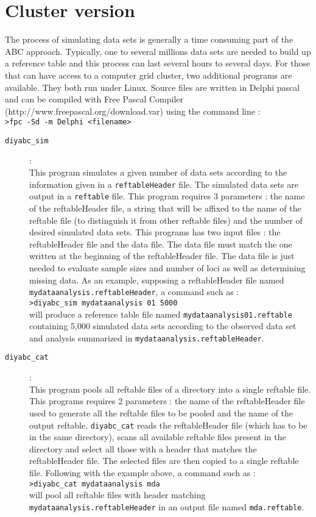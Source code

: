 \clearpage
\section{Cluster version}
The process of simulating data sets is generally a time consuming part of the ABC approach. Typically, one to several millions  data sets are needed to build up a reference table and this process can last several hours to several days. For those  that can have access to a computer grid cluster, two additional programs are available. They both run under Linux. Source files are written in Delphi pascal and can be compiled with Free Pascal Compiler (http://www.freepascal.org/download.var) using the command line :\\
\texttt{>fpc -Sd -m Delphi <filename>}
  \begin{description}
  \item[\texttt{diyabc\_sim}] :\\
  This program simulates a given number of data sets according to the information given in a \texttt{reftableHeader} file. The simulated data sets are output in a \texttt{reftable} file. This program requires 3 parameters : the name of the reftableHeader file, a string that will be affixed to the name of the reftable file (to distinguish it from other reftable files) and the number of desired simulated data sets. This programs has two input files : the reftableHeader file and the data file. The data file must match the one written at the beginning of the reftableHeader file. The data file is just needed to evaluate sample sizes and number of loci as well as determining missing data. As an example, supposing a reftableHeader file named \texttt{mydataanalysis.reftableHeader}, a command such as :\\
  \texttt{>diyabc\_sim mydataanalysis 01 5000}\\
  will produce a reference table file named \texttt{mydataanalysis01.reftable}  containing 5,000 simulated data sets according to the observed data set and analysis summarized in   \texttt{mydataanalysis.reftableHeader}. 
  
  \item[\texttt{diyabc\_cat}]:\\
  This program pools all reftable files of a directory into a single reftable file. This programs requires 2 parameters : the name of the reftableHeader file used to generate all the reftable files to be pooled and the name of the output reftable. \texttt{diyabc\_cat} reads the reftableHeader file (which has to be in the same directory), scans all available reftable files present in the directory and select all those with a header that matches the reftableHeader file.  The selected files are then copied to a single reftable file. Following with the example above, a command such as :\\
  \texttt{>diyabc\_cat mydataanalysis mda}\\
  will pool all reftable files with header matching \texttt{mydataanalysis.reftableHeader} in an output file named \texttt{mda.reftable}. 
  \end{description}
  

